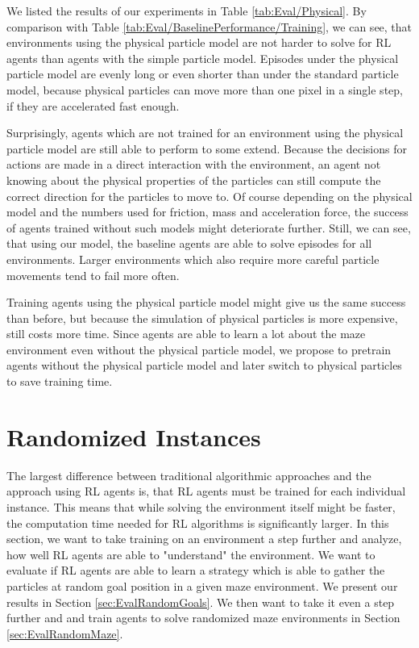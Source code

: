 We listed the results of our experiments in Table \ref{tab:Eval/Physical}. By comparison with Table \ref{tab:Eval/BaselinePerformance/Training}, we can see, that environments using the physical particle model are not harder to solve for RL agents than agents with the simple particle model. Episodes under the physical particle model are evenly long or even shorter than under the standard particle model, because physical particles can move more than one pixel in a single step, if they are accelerated fast enough. 

Surprisingly, agents which are not trained for an environment using the physical particle model are still able to perform to some extend. Because the decisions for actions are made in a direct interaction with the environment, an agent not knowing about the physical properties of the particles can still compute the correct direction for the particles to move to. Of course depending on the physical model and the numbers used for friction, mass and acceleration force, the success of agents trained without such models might deteriorate further. Still, we can see, that using our model, the baseline agents are able to solve episodes for all environments. Larger environments which also require more careful particle movements tend to fail more often. 

Training agents using the physical particle model might give us the same success than before, but because the simulation of physical particles is more expensive, still costs more time. Since agents are able to learn a lot about the maze environment even without the physical particle model, we propose to pretrain agents without the physical particle model and later switch to physical particles to save training time.  

\section{Randomized Instances} \label{sec:EvalRandomness}
The largest difference between traditional algorithmic approaches and the approach using RL agents is, that RL agents must be trained for each individual instance. This means that while solving the environment itself might be faster, the computation time needed for RL algorithms is significantly larger. In this section, we want to take training on an environment a step further and analyze, how well RL agents are able to "understand" the environment. We want to evaluate if RL agents are able to learn a strategy which is able to gather the particles at random goal position in a given maze environment. We present our results in Section \ref{sec:EvalRandomGoals}. We then want to take it even a step further and and train agents to solve randomized maze environments in Section \ref{sec:EvalRandomMaze}. 

